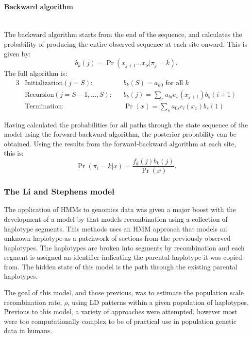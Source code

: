 %
\paragraph{Backward algorithm} \mbox{} \\
The backward algorithm starts from the end of the sequence, and calculates the probability of producing the entire observed sequence at each site onward.
This is given by:
\begin{equation}
    b_k(j) = \Pr( x_{j+1} \dots x_S | \pi_j=k ).
\end{equation}
%
The full algorithm is:
\begin{alignat}{3}
    &\text{Initialization} (j=S):         &&b_k(S)= a_{k0} \text{ for all } k \\
    &\text{Recursion} (j= S-1, \dots, S): &&b_k(j)= \sum_s{ a_{kl} e_s (x_{j+1} ) b_s(i+1) } \\
    &\text{Termination}:                  &&\Pr(x)= \sum_s{ a_{0s} e_l (x_1) b_s(1) }
\end{alignat}

%

Having calculated the probabilities for all paths through the state sequence of the model using the forward-backward algorithm, the posterior probability can be obtained.
Using the results from the forward-backward algorithm at each site, this is:
\begin{equation}
    \Pr( \pi_i = k | x ) = \frac{ f_k(j) b_k(j) }{ \Pr(x) } .
\end{equation}



\subsubsection{The Li and Stephens model}
The application of HMMs to genomics data was given a major boost with the development of a model by \citet{Li2003} that models recombination using a collection of haplotype segments.
This methods uses an HMM approach that models an unknown haplotype as a patchwork of sections from the previously observed haplotypes.
The haplotypes are broken into segments by recombination and each segment is assigned an identifier indicating the parental haplotype it was copied from.
The hidden state of this model is the path through the existing parental haplotypes.

The goal of this model, and those previous, was to estimate the population scale recombination rate, $\rho$, using LD patterns within a given population of haplotypes.
Previous to this model, a variety of approaches were attempted, however most were too computationally complex to be of practical use in population genetic data in humans\cite{Wall2000,Fearnhead2001}.

